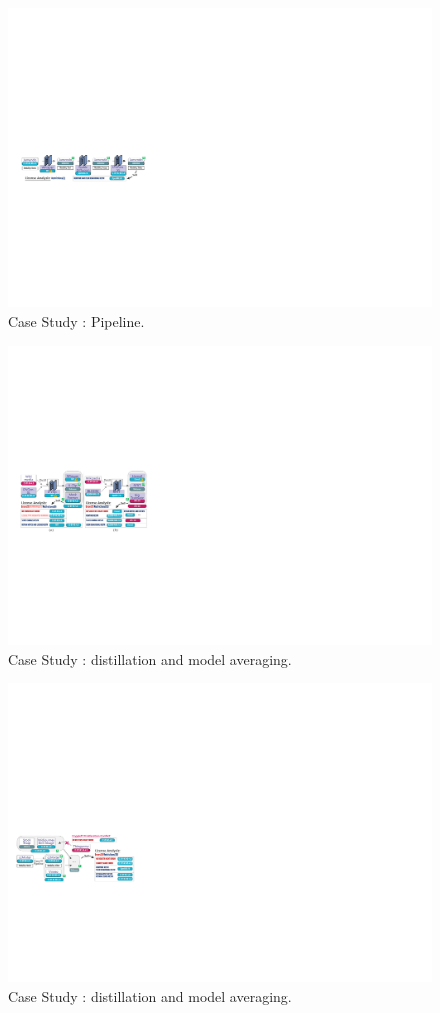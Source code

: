 \begin{figure}[t]
    \centering
    \includegraphics[width=\linewidth]{fig/case3.pdf}
    \caption{Case Study : Pipeline.}
    \Description{}
    \label{fig:case3}
\end{figure}

\begin{figure}[t]
    \centering
    \includegraphics[width=\linewidth]{fig/case4.pdf}
    \caption{Case Study : distillation and model averaging.}
    \Description{}
    \label{fig:case4}
\end{figure}

\begin{figure}[t]
    \centering
    \includegraphics[width=\linewidth]{fig/case5.pdf}
    \caption{Case Study : distillation and model averaging.}
    \Description{}
    \label{fig:case5}
\end{figure}